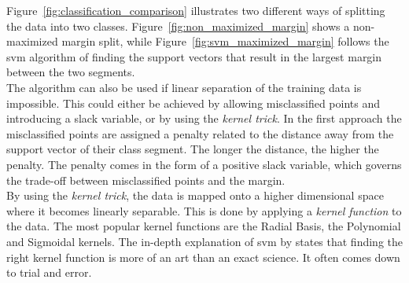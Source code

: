 Figure~\ref{fig:classification_comparison} illustrates two different ways of splitting the data into two classes. Figure~\ref{fig:non_maximized_margin} shows a non-maximized margin split, while Figure~\ref{fig:svm_maximized_margin} follows the \ac{svm} algorithm of finding the support vectors that result in the largest margin between the two segments. \\

The algorithm can also be used if linear separation of the training data is impossible. This could either be achieved by allowing misclassified points and introducing a slack variable, or by using the \textit{kernel trick}. In the first approach the misclassified points are assigned a penalty related to the distance away from the support vector of their class segment. The longer the distance, the higher the penalty. The penalty comes in the form of a positive slack variable, which governs the trade-off between misclassified points and the margin. \\

By using the \textit{kernel trick}, the data is mapped onto a higher dimensional space where it becomes linearly separable. This is done by applying a \textit{kernel function} to the data. The most popular kernel functions are the Radial Basis, the Polynomial and Sigmoidal kernels. The in-depth explanation of \ac{svm} by \cite{Fletcher09} states that finding the right kernel function is more of an art than an exact science. It often comes down to trial and error. \\

